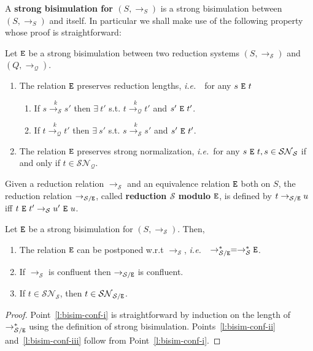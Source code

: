 \documentclass{LMCS}
\newcommand{\ie}{{\it  i.e.}~}
\renewcommand{\>}{\rightarrow}
\newcommand{\Rew}[1]{\rightarrow_{#1}}
\newcommand{\Rewn}[2][*]{\rightarrow^{#1}_{#2}}
\newcommand{\SN}[1]{\mathcal{SN}_{#1}}
\newcommand{\ttE}{{\tt E}}
\renewcommand{\S}{\mathcal{S}}
\newcommand{\Q}{\mathcal{Q}}
\newcommand{\Rewnumber}[2]{\stackrel{#1}{\rightarrow_{#2}}}
\newcommand{\deft}[1]{{\bf #1}}
\newcommand{\modulo}[2]{#1/#2}
\begin{document}
A  \deft{strong bisimulation for $(S, \Rew{S})$} is a 
strong bisimulation between $(S, \Rew{S})$ and itself.
In particular we shall make use of the following property 
 whose proof is straightforward:

\begin{lem}
\label{l:lamj-bis-psn-dif-sys}
Let $\ttE$ be a strong bisimulation between two reduction systems 
$(S, \Rew{\S})$ and $(Q,\Rew{\Q})$. 
\begin{enumerate}
  \item The relation $\ttE$ preserves reduction lengths, \ie\ for any $s\ \ttE\ t$ 
\begin{enumerate}[$\bullet$]
\item If $s \Rewnumber{k}{\S} s'$ then 
      $\exists\ t'$ s.t. $t \Rewnumber{k}{\Q} t'$ and $s'\ \ttE\ t'$.
\item If $t \Rewnumber{k}{\Q} t'$ then  
      $\exists\ s'$ s.t. $s \Rewnumber{k}{\S} s'$ and $s'\ \ttE\ t'$.
\end{enumerate}
\item \label{l:sbisim-pres-psn}The relation $\ttE$ preserves strong normalization, \ie for any $s\ \ttE\ t, 
s\in  \SN{\S}$ if and only if $t\in\SN{\Q}$.
\end{enumerate}
\end{lem}


Given a reduction relation $\Rew{\S}$  and
an equivalence relation $\ttE$ both on $S$, the reduction relation $\Rew{\modulo{\S}{\ttE}}$,
called \deft{reduction $\S$ modulo $\ttE$}, is defined by
$t \Rew{\modulo{\S}{\ttE}} u$ iff $t\ \ttE\ t' \Rew{\S} u'\ \ttE\ u$.


\begin{lem}
\label{l:bisim-conf}
Let $\ttE$ be a strong bisimulation for 
$(S, \Rew{\S})$. Then, 
\begin{enumerate}
  \item \label{l:bisim-conf-i} The relation  $\ttE$ can be postponed
w.r.t $\Rew{\S}$, \ie\ 
$\Rewn{\modulo{\S}{\ttE}}=\Rewn{\S}\ttE$.

  \item \label{l:bisim-conf-ii} If $\Rew{\S}$ is confluent then $\Rew{\modulo{\S}{\ttE}}$ 
   is
    confluent.
\item \label{l:bisim-conf-iii}  If $t \in \SN{\S}$, then $t \in \SN{\modulo{\S}{\ttE}}$.
\end{enumerate}
\end{lem}


\begin{proof}
Point~\ref{l:bisim-conf-i} is straightforward by induction on the
length of $\Rewn{\modulo{\S}{\ttE}}$ using the definition of strong
bisimulation. Points~\ref{l:bisim-conf-ii} and~\ref{l:bisim-conf-iii}
follow from Point~\ref{l:bisim-conf-i}.
\end{proof}
\end{document}
